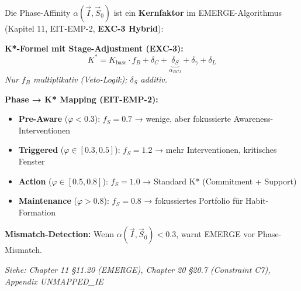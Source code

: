 \begin{tcolorbox}[colback=blue!5!white, colframe=blue!75!black,
    title=\textbf{Cross-Reference: EMERGE Algorithm \& Phase-K* (Chapter 11, 20)}]

Die Phase-Affinity $\alpha(\vec{I}, \vec{S}_0)$ ist ein \textbf{Kernfaktor} im EMERGE-Algorithmus (Kapitel 11, EIT-EMP-2, \textbf{EXC-3 Hybrid}):

\vspace{0.2cm}
\textbf{K*-Formel mit Stage-Adjustment (EXC-3):}
\begin{equation*}
K^* = K_{\text{base}} \cdot f_B + \delta_C + \underbrace{\delta_S}_{\alpha_{BCJ}} + \delta_\gamma + \delta_L
\end{equation*}
\textit{Nur $f_B$ multiplikativ (Veto-Logik); $\delta_S$ additiv.}

\textbf{Phase → K* Mapping (EIT-EMP-2):}
\begin{itemize}[nosep]
\item \textbf{Pre-Aware} ($\varphi < 0.3$): $f_S = 0.7$ → wenige, aber fokussierte Awareness-Interventionen
\item \textbf{Triggered} ($\varphi \in [0.3, 0.5]$): $f_S = 1.2$ → mehr Interventionen, kritisches Fenster
\item \textbf{Action} ($\varphi \in [0.5, 0.8]$): $f_S = 1.0$ → Standard K* (Commitment + Support)
\item \textbf{Maintenance} ($\varphi > 0.8$): $f_S = 0.8$ → fokussiertes Portfolio für Habit-Formation
\end{itemize}

\vspace{0.2cm}
\textbf{Mismatch-Detection:} Wenn $\alpha(\vec{I}, \vec{S}_0) < 0.3$, warnt EMERGE vor Phase-Mismatch.

\vspace{0.2cm}
\textit{Siehe: Chapter 11 §11.20 (EMERGE), Chapter 20 §20.7 (Constraint C7), Appendix UNMAPPED_IE}
\end{tcolorbox}


